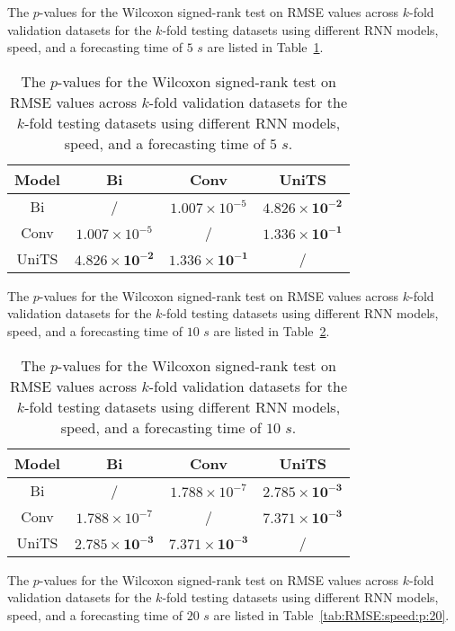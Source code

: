 The $p$-values for the Wilcoxon signed-rank test on RMSE values across $k$-fold validation datasets for the $k$-fold testing datasets using different RNN models, speed, and a forecasting time of $5$ $s$ are listed in Table~\ref{tab:RMSE:speed:p:5}.

\begin{table}[!ht]
	\centering
	\begin{tabular}{|c|c|c|c|}
		\hline
		Model & Bi & Conv & UniTS \\ \hline
		Bi & / & $1.007 \times 10^{-5}$ & $\mathbf{4.826 \times 10^{-2}}$ \\ \hline
		Conv & $1.007 \times 10^{-5}$ & / & $\mathbf{1.336 \times 10^{-1}}$ \\ \hline
		UniTS & $\mathbf{4.826 \times 10^{-2}}$ & $\mathbf{1.336 \times 10^{-1}}$ & / \\ \hline
	\end{tabular}
	\caption{The $p$-values for the Wilcoxon signed-rank test on RMSE values across $k$-fold validation datasets for the $k$-fold testing datasets using different RNN models, speed, and a forecasting time of $5$ $s$.}
	\label{tab:RMSE:speed:p:5}
\end{table}

The $p$-values for the Wilcoxon signed-rank test on RMSE values across $k$-fold validation datasets for the $k$-fold testing datasets using different RNN models, speed, and a forecasting time of $10$ $s$ are listed in Table~\ref{tab:RMSE:speed:p:10}.

\begin{table}[!ht]
	\centering
	\begin{tabular}{|c|c|c|c|}
		\hline
		Model & Bi & Conv & UniTS \\ \hline
		Bi & / & $1.788 \times 10^{-7}$ & $\mathbf{2.785 \times 10^{-3}}$ \\ \hline
		Conv & $1.788 \times 10^{-7}$ & / & $\mathbf{7.371 \times 10^{-3}}$ \\ \hline
		UniTS & $\mathbf{2.785 \times 10^{-3}}$ & $\mathbf{7.371 \times 10^{-3}}$ & / \\ \hline
	\end{tabular}
	\caption{The $p$-values for the Wilcoxon signed-rank test on RMSE values across $k$-fold validation datasets for the $k$-fold testing datasets using different RNN models, speed, and a forecasting time of $10$ $s$.}
	\label{tab:RMSE:speed:p:10}
\end{table}

The $p$-values for the Wilcoxon signed-rank test on RMSE values across $k$-fold validation datasets for the $k$-fold testing datasets using different RNN models, speed, and a forecasting time of $20$ $s$ are listed in Table~\ref{tab:RMSE:speed:p:20}.

